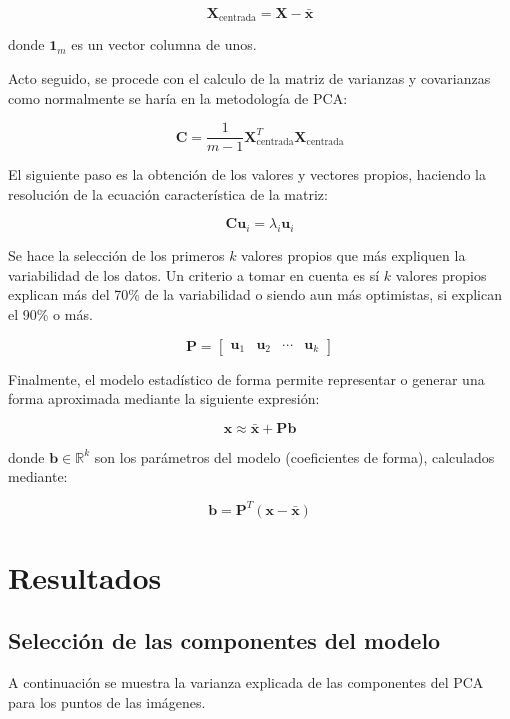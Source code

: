 \documentclass[11pt, letterpaper]{article}
\begin{document}
$$
\mathbf{X}_{\text{centrada}} = \mathbf{X} - \bar{\mathbf{x}}
$$

donde \( \mathbf{1}_m \) es un vector columna de unos.

Acto seguido, se procede con el calculo de la matriz de varianzas y covarianzas como normalmente se haría en la metodología de PCA:


$$
\mathbf{C} = \frac{1}{m - 1} \mathbf{X}_{\text{centrada}}^T \mathbf{X}_{\text{centrada}} 
$$

El siguiente paso es la obtención de los valores y vectores propios, haciendo la resolución de la ecuación característica de la matriz:


$$
\mathbf{C} \mathbf{u}_i = \lambda_i \mathbf{u}_i
$$

Se hace la selección de los primeros $k$ valores propios que más expliquen la variabilidad de los datos. Un criterio a tomar en cuenta es sí $k$ valores propios explican más del 70\% de la variabilidad o siendo aun más optimistas, si explican el 90\% o más.

$$
\mathbf{P} = \begin{bmatrix} \mathbf{u}_1 & \mathbf{u}_2 & \cdots & \mathbf{u}_k \end{bmatrix}
$$

Finalmente, el modelo estadístico de forma permite representar o generar una forma aproximada mediante la siguiente expresión:

$$
\mathbf{x} \approx \bar{\mathbf{x}} + \mathbf{P} \mathbf{b}
$$

donde \( \mathbf{b} \in \mathbb{R}^k \) son los parámetros del modelo (coeficientes de forma), calculados mediante:

$$
\mathbf{b} = \mathbf{P}^T (\mathbf{x} - \bar{\mathbf{x}})
$$




\newpage
	
\section{Resultados}

\subsection{Selección de las componentes del modelo}

A continuación se muestra la varianza explicada de las componentes del PCA para los puntos de las imágenes.
\end{document}
